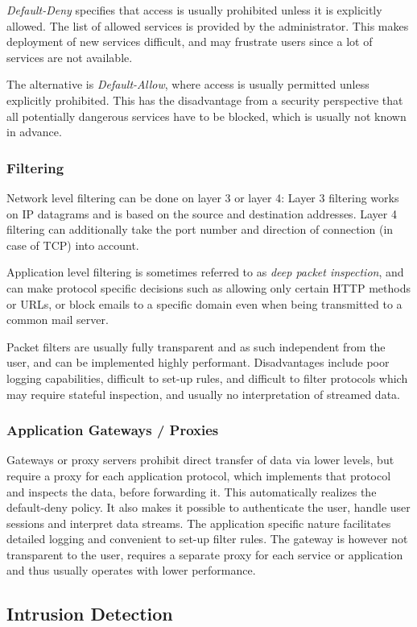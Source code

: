 \emph{Default-Deny} specifies that access is usually prohibited unless it is
explicitly allowed. The list of allowed services is provided by the
administrator. This makes deployment of new services difficult, and may
frustrate users since a lot of services are not available.

The alternative is \emph{Default-Allow}, where access is usually permitted
unless explicitly prohibited. This has the disadvantage from a security
perspective that all potentially dangerous services have to be blocked, which is
usually not known in advance.

\subsubsection{Filtering}
Network level filtering can be done on layer 3 or layer 4: Layer 3 filtering
works on IP datagrams and is based on the source and destination addresses.
Layer 4 filtering can additionally take the port number and direction of
connection (in case of TCP) into account.

Application level filtering is sometimes referred to as \emph{deep packet
inspection}, and can make protocol specific decisions such as allowing only
certain HTTP methods or URLs, or block emails to a specific domain even when
being transmitted to a common mail server.

Packet filters are usually fully transparent and as such independent from the
user, and can be implemented highly performant. Disadvantages include poor
logging capabilities, difficult to set-up rules, and difficult to filter
protocols which may require stateful inspection, and usually no interpretation
of streamed data.

\subsubsection{Application Gateways / Proxies}
Gateways or proxy servers prohibit direct transfer of data via lower levels, but
require a proxy for each application protocol, which implements that protocol
and inspects the data, before forwarding it. This automatically realizes the
default-deny policy. It also makes it possible to authenticate the user, handle
user sessions and interpret data streams. The application specific nature
facilitates detailed logging and convenient to set-up filter rules. The gateway
is however not transparent to the user, requires a separate proxy for each
service or application and thus usually operates with lower performance.

\subsection{Intrusion Detection}
